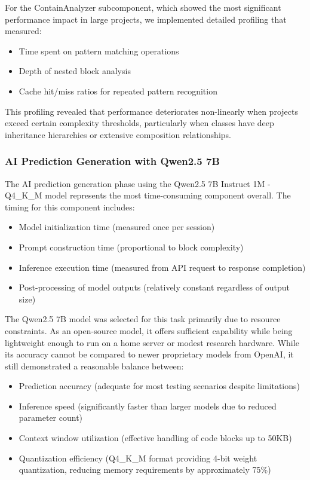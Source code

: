 For the ContainAnalyzer subcomponent, which showed the most significant performance impact in large projects, we implemented detailed profiling that measured:

\begin{itemize}
    \item Time spent on pattern matching operations
    \item Depth of nested block analysis
    \item Cache hit/miss ratios for repeated pattern recognition
\end{itemize}

This profiling revealed that performance deteriorates non-linearly when projects exceed certain complexity thresholds, particularly when classes have deep inheritance hierarchies or extensive composition relationships.

\subsubsection{AI Prediction Generation with Qwen2.5 7B}

The AI prediction generation phase using the Qwen2.5 7B Instruct 1M - Q4\_K\_M model represents the most time-consuming component overall. The timing for this component includes:

\begin{itemize}
    \item Model initialization time (measured once per session)
    \item Prompt construction time (proportional to block complexity)
    \item Inference execution time (measured from API request to response completion)
    \item Post-processing of model outputs (relatively constant regardless of output size)
\end{itemize}

The Qwen2.5 7B model was selected for this task primarily due to resource constraints. As an open-source model, it offers sufficient capability while being lightweight enough to run on a home server or modest research hardware. While its accuracy cannot be compared to newer proprietary models from OpenAI, it still demonstrated a reasonable balance between:

\begin{itemize}
    \item Prediction accuracy (adequate for most testing scenarios despite limitations)
    \item Inference speed (significantly faster than larger models due to reduced parameter count)
    \item Context window utilization (effective handling of code blocks up to 50KB)
    \item Quantization efficiency (Q4\_K\_M format providing 4-bit weight quantization, reducing memory requirements by approximately 75\%)
\end{itemize}

